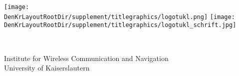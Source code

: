 %
%
%
\begin{minipage}{\textwidth}%
\begin{flushleft}%
\texttt{[image: \\DenKrLayoutRootDir/supplement/titlegraphics/logotukl.png]}%
\hspace*{1em}%
\texttt{[image: \\DenKrLayoutRootDir/supplement/titlegraphics/logotukl\_schrift.jpg]}%
\textsc{\Large }%
\end{flushleft}%
\end{minipage}%
\hfill%
\begin{minipage}{0.5\textwidth}%
\begin{flushright}%
\end{flushright}%
\end{minipage}%
\\%
%
\vspace*{0.05\textheight}%
%

%
\vfill\vfill%
{\large {}\selectfont Institute for Wireless Communication and Navigation}\\%
{\large {}\selectfont University of Kaiserslautern}%
%

%
%